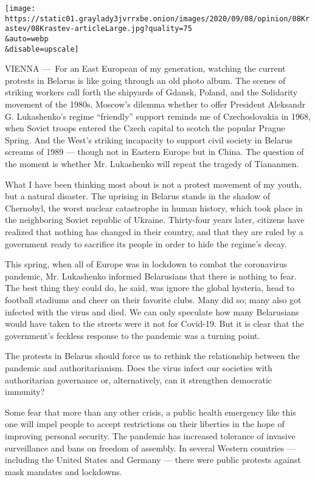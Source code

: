 \texttt{[image: https://static01.graylady3jvrrxbe.onion/images/2020/09/08/opinion/08Krastev/08Krastev-articleLarge.jpg?quality=75\\\&auto=webp\\\&disable=upscale]}

VIENNA ---~For an East European of my generation, watching the current
protests in Belarus is like going through an old photo album. The scenes
of striking workers call forth the shipyards of Gdansk, Poland, and the
Solidarity movement of the 1980s. Moscow's dilemma whether to offer
President Aleksandr G. Lukashenko's regime ``friendly'' support reminds
me of Czechoslovakia in 1968, when Soviet troops entered the Czech
capital to scotch the popular Prague Spring. And the West's striking
incapacity to support civil society in Belarus screams of 1989 ---
though not in Eastern Europe but in China. The question of the moment is
whether Mr. Lukashenko will repeat the tragedy of Tiananmen.

What I have been thinking most about is not a protest movement of my
youth, but a natural disaster. The uprising in Belarus stands in the
shadow of Chernobyl, the worst nuclear catastrophe in human history,
which took place in the neighboring Soviet republic of Ukraine.
Thirty-four years later, citizens have realized that nothing has changed
in their country, and that they are ruled by a government ready to
sacrifice its people in order to hide the regime's decay.

This spring, when all of Europe was in lockdown to combat the
coronavirus pandemic, Mr. Lukashenko informed Belarusians that there is
nothing to fear. The best thing they could do, he said, was ignore the
global hysteria, head to football stadiums and cheer on their favorite
clubs. Many did so; many also got infected with the virus and died. We
can only speculate how many Belarusians would have taken to the streets
were it not for Covid-19. But it is clear that the government's feckless
response to the pandemic was a turning point.

The protests in Belarus should force us to rethink the relationship
between the pandemic and authoritarianism. Does the virus infect our
societies with authoritarian governance or, alternatively, can it
strengthen democratic immunity?

Some fear that more than any other crisis, a public health emergency
like this one will impel people to accept restrictions on their
liberties in the hope of improving personal security. The pandemic has
increased tolerance of invasive surveillance and bans on freedom of
assembly. In several Western countries --- including the United States
and Germany --- there were public protests against mask mandates and
lockdowns.

